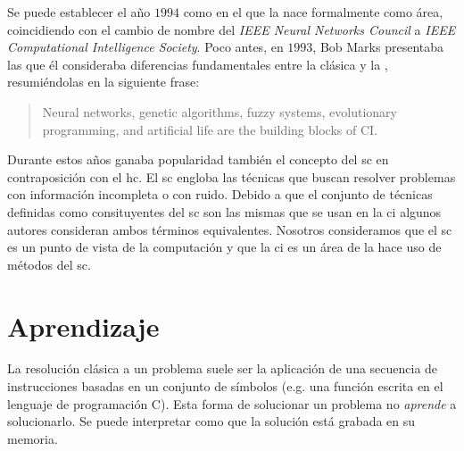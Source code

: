 Se puede establecer el año $1994$ como en el que la  nace formalmente como área, coincidiendo con el cambio de nombre del \textit{IEEE Neural Networks Council} a \textit{IEEE Computational Intelligence Society}. Poco antes, en $1993$, Bob Marks presentaba las que él consideraba diferencias fundamentales entre la  clásica y la , resumiéndolas en la siguiente frase:

\blockquote{Neural networks, genetic algorithms, fuzzy systems, evolutionary programming, and artificial life are the building blocks of CI.}

Durante estos años ganaba popularidad también el concepto del \gls{sc} en contraposición con el \gls{hc}. El \gls{sc} engloba las técnicas que buscan resolver problemas con información incompleta o con ruido. Debido a que el conjunto de técnicas definidas como consituyentes del \gls{sc} son las mismas que se usan en la \gls{ci} algunos autores consideran ambos términos equivalentes. Nosotros consideramos que el \gls{sc} es un punto de vista de la computación y que la \gls{ci} es un área de la  hace uso de métodos del \gls{sc}.


\section{Aprendizaje}


La resolución clásica a un problema suele ser la aplicación de una secuencia de instrucciones basadas en un conjunto de símbolos (e.g. una función escrita en el lenguaje de programación C). Esta forma de solucionar un problema no \textit{aprende} a solucionarlo. Se puede interpretar como que la solución está grabada en su memoria.

